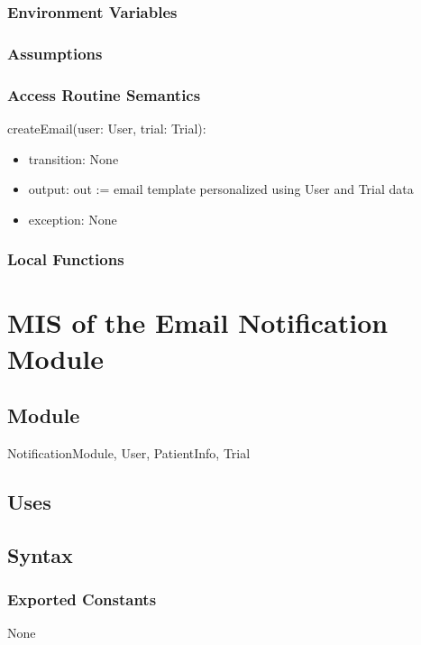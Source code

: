 \documentclass[12pt, titlepage]{article}
\begin{document}
\subsubsection{Environment Variables}

\subsubsection{Assumptions}

\subsubsection{Access Routine Semantics}

\noindent createEmail(user: User, trial: Trial):
\begin{itemize}
\item transition: None
\item output: out := email template personalized using User and Trial data
\item exception: None
\end{itemize}

\subsubsection{Local Functions}

\section{MIS of the Email Notification Module} \label{User}

\subsection{Module}

NotificationModule, User, PatientInfo, Trial

\subsection{Uses}


\subsection{Syntax}

\subsubsection{Exported Constants}
None
\end{document}
